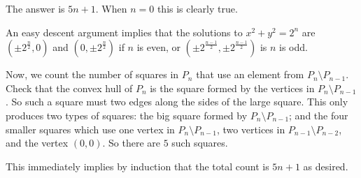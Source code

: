 The answer is $\boxed{5n+1}$. When $n=0$ this is clearly true.

An easy descent argument implies that the solutions to $x^2+y^2=2^n$ are $(\pm2^{\frac{n}{2}},0)$ and $(0,\pm2^{\frac{n}{2}})$ if $n$ is even, or $(\pm2^{\frac{n-1}{2}},\pm2^{\frac{n-1}{2}})$ is $n$ is odd.

Now, we count the number of squares in $P_n$ that use an element from $P_n\setminus P_{n-1}$. Check that the convex hull of $P_n$ is the square formed by the vertices in $P_n\setminus P_{n-1}$. So such a square must two edges along the sides of the large square. This only produces two types of squares: the big square formed by $P_n\setminus P_{n-1}$; and the four smaller squares which use one vertex in $P_n\setminus P_{n-1}$, two vertices in $P_{n-1}\setminus P_{n-2}$, and the vertex $(0,0)$. So there are $5$ such squares.

This immediately implies by induction that the total count is $5n+1$ as desired.